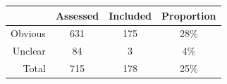 \begin{tabular}{rccc}
\toprule
 & Assessed & Included & Proportion \\
\midrule
Obvious & 631 & 175 & 28\% \\
Unclear & 84 & 3 & 4\% \\
\midrule
Total & 715 & 178 & 25\% \\
\bottomrule
\end{tabular}